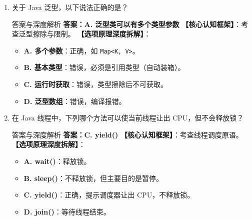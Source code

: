 ﻿\documentclass[12pt, a4paper]{ctexart}
\newcommand{\code}[1]{\texttt{#1}}
\begin{document}
\begin{enumerate}[label=\arabic*., itemsep=1.5em]
	\item 关于 Java 泛型，以下说法正确的是？
	      \begin{bluebox}{答案与深度解析}
		      \textbf{答案：A. 泛型类可以有多个类型参数}
		      \textbf{【核心认知框架】}：考查泛型擦除与限制。
		      \textbf{【选项原理深度拆解】}：
		      \begin{itemize}[leftmargin=*, nosep]
			      \item \textbf{A. 多个参数}：正确，如 \code{Map<K, V>}。
			      \item \textbf{B. 基本类型}：错误，必须是引用类型（自动装箱）。
			      \item \textbf{C. 运行时获取}：错误，类型擦除后不可获取。
			      \item \textbf{D. 泛型数组}：错误，编译报错。
		      \end{itemize}
	      \end{bluebox}

	\item 在 Java 线程中，下列哪个方法可以使当前线程让出 CPU，但不会释放锁？
	      \begin{bluebox}{答案与深度解析}
		      \textbf{答案：C. yield()}
		      \textbf{【核心认知框架】}：考查线程调度原语。
		      \textbf{【选项原理深度拆解】}：
		      \begin{itemize}[leftmargin=*, nosep]
			      \item \textbf{A. wait()}：释放锁。
			      \item \textbf{B. sleep()}：不释放锁，但主要目的是暂停。
			      \item \textbf{C. yield()}：正确，提示调度器让出 CPU，不释放锁。
			      \item \textbf{D. join()}：等待线程结束。
		      \end{itemize}
	      \end{bluebox}


\end{enumerate}
\end{document}
